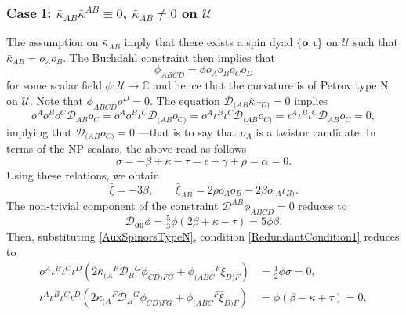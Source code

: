\documentclass[10pt,a4paper]{article}
\newcommand\omicron{o}
\theoremstyle{plain}
\begin{document}
\subsubsection{Case I: $\bar{\kappa}_{AB}\bar{\kappa}^{AB}\equiv 0$, $\bar{\kappa}_{AB}\neq 0$ on $\mathcal{U}$} \label{TypeNCase}

The assumption on $\bar{\kappa}_{AB}$ imply that there exists a spin
dyad $\lbrace \bm\omicron, \bm\iota\rbrace$ on $\mathcal{U}$ such that
$\bar{\kappa}_{AB}=\omicron_A\omicron_B$. The Buchdahl constraint then
implies that
\begin{equation}
\phi_{ABCD}=\phi \omicron_A\omicron_B\omicron_C\omicron_D
\end{equation}
for some scalar field $\phi:\mathcal{U}\rightarrow\mathbb{C}$ and
hence that the curvature is of Petrov type N on $\mathcal{U}$. Note
that $\phi_{ABCD}\omicron^D=0$. The equation
$\mathcal{D}_{(AB}\bar{\kappa}_{CD)}=0$ implies
\begin{equation*}
 \omicron^A \omicron^B \omicron^C \mathcal{D}_{AB}\omicron_C=
 \omicron^A \omicron^B \iota^C\mathcal{D}_{(AB}\omicron_{C)}=
 \omicron^A \iota^B \iota^C\mathcal{D}_{(AB}\omicron_{C)}= \iota^A
 \iota^B \iota^C\mathcal{D}_{AB}\omicron_{C}=0,
\end{equation*}
implying that $\mathcal{D}_{(AB}\omicron_{C)}=0$ ---that is to say
that $\omicron_A$ is a twistor candidate. In terms of the NP scalars,
the above read as follows
\begin{equation}\label{NPRelationsTypeN} 
\sigma=- \beta + \kappa - \tau=\epsilon - \gamma + \rho=\alpha=0.
\end{equation}	
Using these relations, we obtain
\begin{equation}\label{AuxSpinorsTypeN}
 \bar{\xi} = -3\beta,\qquad \bar{\xi}_{AB} = 2\rho o_Ao_B - 2\beta
 o_{(A}\iota_{B)}.
\end{equation}
The non-trivial component of the constraint
$\mathcal{D}^{AB}\phi_{ABCD}=0$ reduces to
\begin{equation}
 \mathcal{D}_{\bm0\bm0}\phi = \tfrac{5}{3}\phi (2\beta + \kappa -
 \tau)=5\phi\beta.\label{TypeNweylConstraint}
\end{equation}
Then, substituting \eqref{AuxSpinorsTypeN}, condition
\eqref{RedundantCondition1} reduces to
\begin{align*}
\omicron^A \iota^B \iota^C \iota^D
\left(2\bar{\kappa}_{(A}{}^{F}\mathcal{D}_{B}{}^{G}\phi_{CD)FG} +
\phi_{(ABC}{}^{F}\bar{\xi}_{D)F}\right) &=\tfrac{1}{2}\phi\sigma
=0,\\ \iota^A\iota^B \iota^C \iota^D
\left(2\bar{\kappa}_{(A}{}^{F}\mathcal{D}_{B}{}^{G}\phi_{CD)FG} +
\phi_{(ABC}{}^{F}\bar{\xi}_{D)F}\right) &=\phi(\beta - \kappa + \tau)
= 0,
\end{align*}
\end{document}

